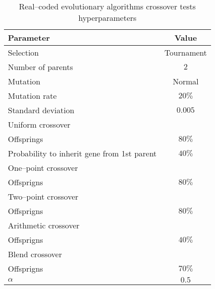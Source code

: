 \begin{table}[h]
    \centering
    \begin{tabular}{|l|c|}
        \hline
        \textbf{Parameter} & \textbf{Value} \\
        \hline
        Selection & Tournament \\
        \quad Number of parents & $2$ \\
        Mutation & Normal \\
        \quad Mutation rate & $20\%$ \\
        \quad Standard deviation & $0.005$ \\
        \hline
        Uniform crossover & \\
        \quad Offsprings & $80\%$ \\
        \quad Probability to inherit gene from 1st parent & $40\%$ \\
        One--point crossover & \\
        \quad Offsprigns & $80\%$ \\
        Two--point crossover & \\
        \quad Offsprigns & $80\%$ \\
        Arithmetic crossover & \\
        \quad Offsprigns & $40\%$ \\
        Blend crossover & \\
        \quad Offsprigns & $70\%$ \\
        \quad $\alpha$ & $0.5$ \\
        \hline
    \end{tabular}
    \caption{Real--coded evolutionary algorithms crossover tests hyperparameters}
    \label{tab:escrossoverhyperparmarameters}
\end{table}

